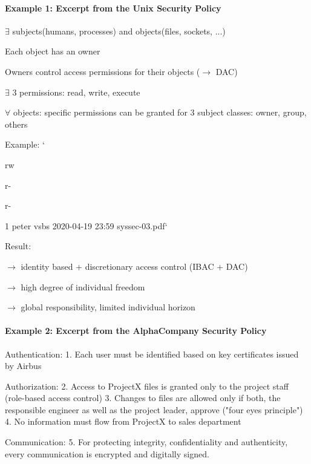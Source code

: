 \documentclass[a4paper]{article}
\begin{document}
\begin{multicols}{3}
    \paragraph{Example 1: Excerpt from the Unix Security Policy}
    \begin{itemize*}
        \item $\exists$ subjects(humans, processes) and objects(files, sockets, ...)
        \item Each object has an owner
        \item Owners control access permissions for their objects ($\rightarrow$  DAC)
        \item $\exists$ 3 permissions: read, write, execute
        \item $\forall$ objects: specific permissions can be granted for 3 subject classes: owner, group, others
        \item Example: `\item rw\item r-\item r-\item 1 peter vsbs 2020-04-19 23:59 syssec-03.pdf`
        \item Result:
              \begin{itemize*}
                  \item $\rightarrow$  identity based + discretionary access control (IBAC + DAC)
                  \item $\rightarrow$  high degree of individual freedom
                  \item $\rightarrow$  global responsibility, limited individual horizon
              \end{itemize*}
    \end{itemize*}

    \paragraph{Example 2: Excerpt from the AlphaCompany Security Policy}
    \begin{itemize*}
        \item Authentication:
              1. Each user must be identified based on key certificates issued by Airbus
        \item Authorization:
              2. Access to ProjectX files is granted only to the project staff (role-based access control)
              3. Changes to files are allowed only if both, the responsible engineer as well as the project leader, approve ("four eyes principle")
              4. No information must flow from ProjectX to sales department
        \item Communication:
              5. For protecting integrity, confidentiality and authenticity, every communication is encrypted and digitally signed.
    \end{itemize*}


\end{multicols}
\end{document}
